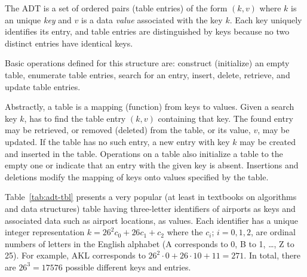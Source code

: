 \begin{Definition} The  ADT is a set of ordered pairs 
(table entries) of the form \((k,v)\) where \(k\) is an unique \emph{key} and 
\(v\) is a data \emph{value} associated with the key \(k\). Each key uniquely
identifies its entry, and table entries are distinguished by keys
because no two distinct entries have identical keys. 

Basic operations defined for this structure are: construct (initialize) an 
empty table, enumerate table entries, search for an entry, insert, delete, retrieve, and 
update table entries.
\end{Definition}

Abstractly, a table is a mapping (function) from keys to values. Given a 
search key \(k\),  has to find the table entry 
\((k,v)\) containing that key. The found entry may be retrieved, or removed 
(deleted) from the table, or its value, \(v\), may be updated. If the table
has no such entry, a new entry with key \(k\) may be  created and inserted in 
the table. Operations on a table also initialize a table to the 
empty one or indicate that an entry with the given key is absent. Insertions 
and deletions modify the mapping of keys onto values specified by
the table.

\begin{Example}
\label{exm:adt:airports} 
Table~\ref{tab:adt-tbl} 
presents a very popular (at least in textbooks on algorithms and data
structures)  table having three-letter identifiers
of airports as keys and associated data such as
airport locations, as values. Each identifier
has a unique integer
representation \(k = 26^2 c_0 + 26c_1 + c_2\) where the \(c_i\); 
\(i=0,1,2\), are ordinal numbers of 
letters in the English alphabet
(A corresponds to  0, B to 1, \ldots, Z to 25). For example, 
AKL corresponds to $26^2 \cdot 0 + 26\cdot 10 + 11 = 271$. In total, there are  
$26^3=17576$ possible different keys and entries.
\end{Example}

